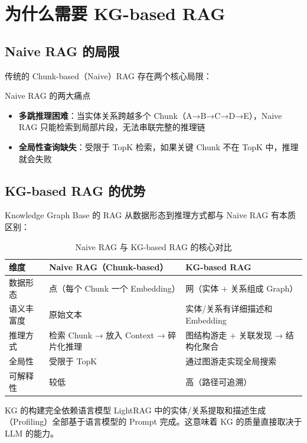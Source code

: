 \documentclass[a4paper]{article}
\begin{document}
\section{为什么需要 KG-based RAG}

\subsection{Naive RAG 的局限}

传统的 Chunk-based（Naive）RAG 存在两个核心局限：

\begin{importantbox}{Naive RAG 的两大痛点}
\begin{itemize}
    \item \textbf{多跳推理困难}：当实体关系跨越多个 Chunk（A→B→C→D→E），Naive RAG 只能检索到局部片段，无法串联完整的推理链
    \item \textbf{全局性查询缺失}：受限于 TopK 检索，如果关键 Chunk 不在 TopK 中，推理就会失败
\end{itemize}
\end{importantbox}

\subsection{KG-based RAG 的优势}

Knowledge Graph Base 的 RAG 从数据形态到推理方式都与 Naive RAG 有本质区别：

\begin{table}[H]
\centering
\begin{tabular}{p{3cm}p{5cm}p{5cm}}
\toprule
\textbf{维度} & \textbf{Naive RAG（Chunk-based）} & \textbf{KG-based RAG} \\
\midrule
数据形态 & 点（每个 Chunk 一个 Embedding） & 网（实体 + 关系组成 Graph） \\
语义丰富度 & 原始文本 & 实体/关系有详细描述和 Embedding \\
推理方式 & 检索 Chunk → 放入 Context → 碎片化推理 & 图结构游走 + 关联发现 → 结构化聚合 \\
全局性 & 受限于 TopK & 通过图游走实现全局搜索 \\
可解释性 & 较低 & 高（路径可追溯） \\
\bottomrule
\end{tabular}
\caption{Naive RAG 与 KG-based RAG 的核心对比}
\end{table}

\begin{knowledgebox}{KG 的构建完全依赖语言模型}
LightRAG 中的实体/关系提取和描述生成（Profiling）全部基于语言模型的 Prompt 完成。这意味着 KG 的质量直接取决于 LLM 的能力。
\end{knowledgebox}
\end{document}
